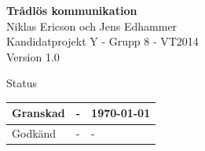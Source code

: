 \documentclass[a4paper,12pt,fleqn]{article}
\begin{document}
	\pagestyle{fancy}
	\vspace*{\fill}
		\begingroup
			\begin{center}
				\huge{\textbf{Trådlös kommunikation}}
				\\
				\vspace{10pt}
				\normalsize
				Niklas Ericson och Jens Edhammer
				\\
				Kandidatprojekt Y - Grupp 8 - VT2014
				\\
				Version 1.0
				\end{center}
		\endgroup
	\vspace*{\fill}
	
	\begin{center} %
		Status
		\\
		\vspace{3pt} %
	    \begin{tabular}{| p{3cm} | p{3cm} | p{3cm} |} %
	    \hline %
	    Granskad & - & \today \\ \hline %
		Godkänd & - & - \\ \hline %

	    \end{tabular}
	\end{center}
	\vspace{2cm}
	\newpage
	
\end{document}
